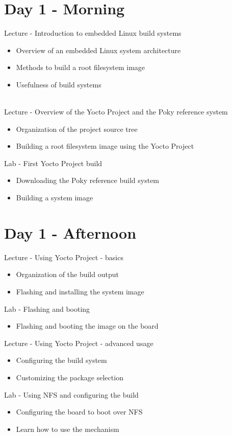 \documentclass[a4paper,12pt,obeyspaces,spaces,hyphens]{article}
\begin{document}
\section{Day 1 - Morning}

\feagendaonecolumn
{Lecture - Introduction to embedded Linux build systems}
{
  \begin{itemize}
  \item Overview of an embedded Linux system architecture
  \item Methods to build a root filesystem image
  \item Usefulness of build systems
  \end{itemize}
}
\\
\feagendatwocolumn
{Lecture - Overview of the Yocto Project and the Poky reference system}
{
  \begin{itemize}
  \item Organization of the project source tree
  \item Building a root filesystem image using the Yocto Project
  \end{itemize}
}
{Lab - First Yocto Project build}
{
  \begin{itemize}
  \item Downloading the Poky reference build system
  \item Building a system image
 \end{itemize}
}

\section{Day 1 - Afternoon}
\feagendatwocolumn
{Lecture - Using Yocto Project - basics}
{
  \begin{itemize}
  \item Organization of the build output
  \item Flashing and installing the system image
  \end{itemize}
}
{Lab - Flashing and booting}
{
  \begin{itemize}
  \item Flashing and booting the image on the board
  \end{itemize}
}

\feagendatwocolumn
{Lecture - Using Yocto Project - advanced usage}
{
  \begin{itemize}
  \item Configuring the build system
  \item Customizing the package selection
  \end{itemize}
}
{Lab - Using NFS and configuring the build}
{
  \begin{itemize}
  \item Configuring the board to boot over NFS
  \item Learn how to use the  mechanism
  \end{itemize}
}
\\
\end{document}
